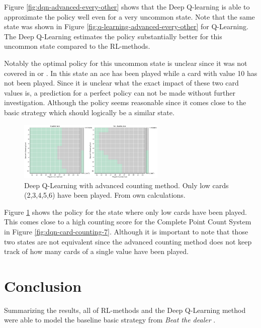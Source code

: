 \documentclass[conference]{IEEEtran}
\begin{document}
Figure \ref{fig:dqn-advanced-every-other} shows that the Deep Q-learning is able to approximate the policy well even for a very uncommon state. 
Note that the same state was shown in Figure \ref{fig:q-learning-advanced-every-other} for Q-Learning. 
The Deep Q-Learning estimates the policy substantially better for this uncommon state compared to the RL-methods. 

Notably the optimal policy for this uncommon state is unclear since it was not covered in \cite{b1} or \cite{b4}.
In this state an ace has been played while a card with value 10 has not been played. 
Since it is unclear what the exact impact of these two card values is, a prediction for a perfect policy can not be made without further investigation. 
Although the policy seems reasonable since it comes close to the basic strategy \cite{b1} which should logically be a similar state.

\begin{figure}
	\centering
	\includegraphics[width=70mm]{figures/DQN/advanced/policy-low-cards-played.png}
	\caption{Deep Q-Learning with advanced counting method. Only low cards (2,3,4,5,6) have been played. From own calculations.}
	\label{fig:dqn-advanced-only-low}
\end{figure}

Figure \ref{fig:dqn-advanced-only-low} shows the policy for the state where only low cards have been played. 
This comes close to a high counting score for the Complete Point Count System in Figure \ref{fig:dqn-card-counting-7}.
Although it is important to note that those two states are not equivalent since the advanced counting method does not keep track of how many cards of a single value have been played.



\section{Conclusion}
Summarizing the results, all of RL-methods and the Deep Q-Learning method were able to model the baseline basic strategy from \textit{Beat the dealer} \cite{b1}.
\end{document}

